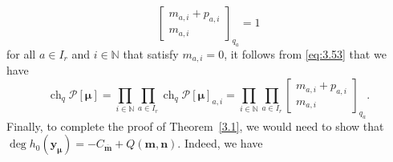 \documentclass[10pt,a4paper]{amsart}
\numberwithin{equation}{section}
\DeclareMathOperator{\ch}{ch}
\begin{document}
\begin{equation*}
\begin{bmatrix} m_{a,i}+p_{a,i}\\m_{a,i}\end{bmatrix}_{q_a}=1
\end{equation*}
for all $a\in I_r$ and $i\in\mathbb{N}$ that satisfy $m_{a,i}=0$, it follows from \eqref{eq:3.53} that we have
\begin{equation}\label{eq:3.54}
\ch_q\mathcal{P}[\bm{\mu}]
=\prod_{i\in\mathbb{N}}\prod_{a\in I_r}\ch_q\mathcal{P}[\bm{\mu}]_{a,i}
=\prod_{i\in\mathbb{N}}\prod_{a\in I_r}\begin{bmatrix} m_{a,i}+p_{a,i} \\m_{a,i}\end{bmatrix}_{q_a}.
\end{equation}
Finally, to complete the proof of Theorem~\ref{3.1}, we would need to show that $\deg h_0(\mathbf{y}_{\bm{\mu}})=-C_{\overline{ \mathbf{m}}}+Q(\mathbf{m},\mathbf{n})$. Indeed, we have
\end{document}
